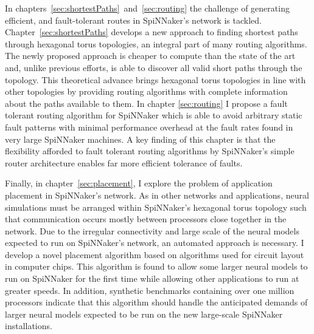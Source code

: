 In chapters~\ref{sec:shortestPaths}~and~\ref{sec:routing} the challenge of
generating efficient, and fault-tolerant routes in SpiNNaker's network is
tackled. Chapter~\ref{sec:shortestPaths} develops a new approach to finding
shortest paths through hexagonal torus topologies, an integral part of many
routing algorithms. The newly proposed approach is cheaper to compute than the
state of the art and, unlike previous efforts, is able to discover all valid
short paths through the topology. This theoretical advance brings hexagonal
torus topologies in line with other topologies by providing routing algorithms
with complete information about the paths available to them. In chapter
\ref{sec:routing} I propose a fault tolerant routing algorithm for SpiNNaker
which is able to avoid arbitrary static fault patterns with minimal performance
overhead at the fault rates found in very large SpiNNaker machines. A key
finding of this chapter is that the flexibility afforded to fault tolerant
routing algorithms by SpiNNaker's simple router architecture enables far more
efficient tolerance of faults.

Finally, in chapter~\ref{sec:placement}, I explore the problem of application
placement in SpiNNaker's network. As in other networks and applications, neural
simulations must be arranged within SpiNNaker's hexagonal torus topology such
that communication occurs mostly between processors close together in the
network. Due to the irregular connectivity and large scale of the neural models
expected to run on SpiNNaker's network, an automated approach is necessary. I
develop a novel placement algorithm based on algorithms used for circuit layout
in computer chips. This algorithm is found to allow some larger neural models
to run on SpiNNaker for the first time while allowing other applications to run
at greater speeds. In addition, synthetic benchmarks containing over one
million processors indicate that this algorithm should handle the anticipated
demands of larger neural models expected to be run on the new large-scale
SpiNNaker installations.
